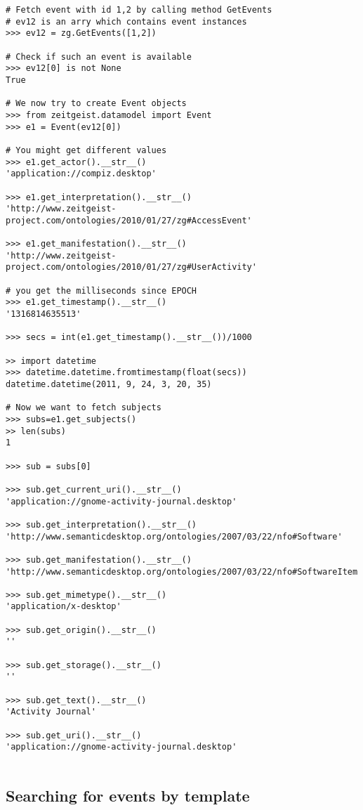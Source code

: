 \begin{center}
\begin{verbatim}
# Fetch event with id 1,2 by calling method GetEvents
# ev12 is an arry which contains event instances
>>> ev12 = zg.GetEvents([1,2])

# Check if such an event is available
>>> ev12[0] is not None
True

# We now try to create Event objects
>>> from zeitgeist.datamodel import Event
>>> e1 = Event(ev12[0])

# You might get different values
>>> e1.get_actor().__str__()
'application://compiz.desktop'

>>> e1.get_interpretation().__str__()
'http://www.zeitgeist-project.com/ontologies/2010/01/27/zg#AccessEvent'

>>> e1.get_manifestation().__str__()
'http://www.zeitgeist-project.com/ontologies/2010/01/27/zg#UserActivity'

# you get the milliseconds since EPOCH
>>> e1.get_timestamp().__str__()
'1316814635513'

>>> secs = int(e1.get_timestamp().__str__())/1000

>> import datetime
>>> datetime.datetime.fromtimestamp(float(secs))
datetime.datetime(2011, 9, 24, 3, 20, 35)

# Now we want to fetch subjects
>>> subs=e1.get_subjects()
>> len(subs)
1

>>> sub = subs[0]

>>> sub.get_current_uri().__str__()
'application://gnome-activity-journal.desktop'

>>> sub.get_interpretation().__str__()
'http://www.semanticdesktop.org/ontologies/2007/03/22/nfo#Software'

>>> sub.get_manifestation().__str__()
'http://www.semanticdesktop.org/ontologies/2007/03/22/nfo#SoftwareItem'

>>> sub.get_mimetype().__str__()
'application/x-desktop'

>>> sub.get_origin().__str__()
''

>>> sub.get_storage().__str__()
''

>>> sub.get_text().__str__()
'Activity Journal'

>>> sub.get_uri().__str__()
'application://gnome-activity-journal.desktop'


\end{verbatim}
\end{center}

\subsection{Searching for events by template}

